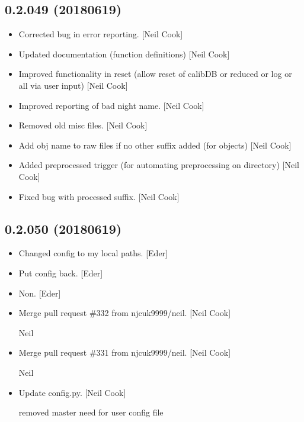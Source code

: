 \documentclass[a4paper,10pt,english]{report}
\begin{document}
\subsection{0.2.049 (2018\sphinxhyphen{}06\sphinxhyphen{}19)}
\label{\detokenize{misc/changelog:id435}}\begin{itemize}
\item {} 
Corrected bug in  error reporting. {[}Neil Cook{]}

\item {} 
Updated documentation (function definitions) {[}Neil Cook{]}

\item {} 
Improved functionality in reset (allow reset of calibDB or reduced or
log or all via user input) {[}Neil Cook{]}

\item {} 
Improved reporting of bad night name. {[}Neil Cook{]}

\item {} 
Removed old misc files. {[}Neil Cook{]}

\item {} 
Add obj name to raw files if no other suffix added (for objects) {[}Neil
Cook{]}

\item {} 
Added preprocessed trigger (for automating pre\sphinxhyphen{}processing on
 directory) {[}Neil Cook{]}

\item {} 
Fixed bug with processed suffix. {[}Neil Cook{]}

\end{itemize}


\subsection{0.2.050 (2018\sphinxhyphen{}06\sphinxhyphen{}19)}
\label{\detokenize{misc/changelog:id436}}\begin{itemize}
\item {} 
Changed config to my local paths. {[}Eder{]}

\item {} 
Put config back. {[}Eder{]}

\item {} 
Non. {[}Eder{]}

\item {} 
Merge pull request \#332 from njcuk9999/neil. {[}Neil Cook{]}

Neil

\item {} 
Merge pull request \#331 from njcuk9999/neil. {[}Neil Cook{]}

Neil

\item {} 
Update config.py. {[}Neil Cook{]}

removed master need for user config file

\end{itemize}
\end{document}
